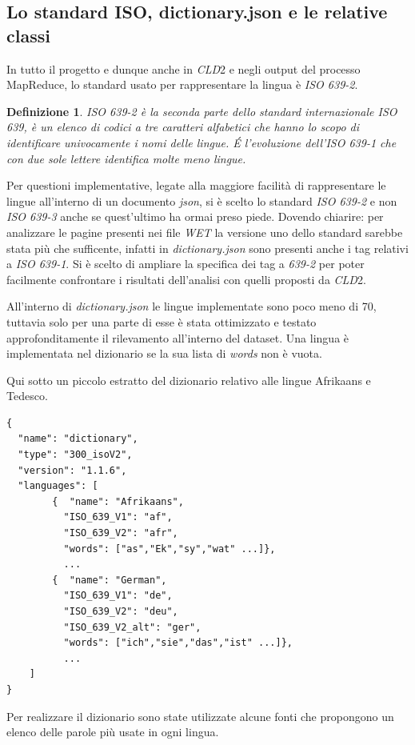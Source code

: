 \documentclass{article}
\newcommand{\MR}{MapReduce}
\newcommand{\cld}{\textit{CLD}2}
\newcommand{\WET}{\textit{WET}}
\newcommand{\isoOne}{\textit{ISO 639-1}}
\newcommand{\isoTwo}{\textit{ISO 639-2}}
\newcommand{\isoThree}{\textit{ISO 639-3}}
\newcommand{\filename}[1]{\textit{#1}}
\newtheorem*{definition}{Definizione}
\begin{document}
\subsection{Lo standard ISO, dictionary.json e le relative classi}
In tutto il progetto e dunque anche in \cld{} e negli output del processo \MR{}, lo standard usato per rappresentare la lingua è \isoTwo{}.

\begin{definition}
ISO 639-2 è la seconda parte dello standard internazionale ISO 639, è un elenco di codici a tre caratteri alfabetici che hanno lo scopo di identificare univocamente i nomi delle lingue. \'E l'evoluzione dell'ISO 639-1 che con due sole lettere identifica molte meno lingue. 
\end{definition}

Per questioni implementative, legate alla maggiore facilità di rappresentare le lingue all'interno di un documento \textit{json}, si è scelto lo standard \isoTwo{} e non \isoThree{} anche se quest'ultimo ha ormai preso piede. Dovendo chiarire: per analizzare le pagine presenti nei file \WET{} la versione uno dello standard sarebbe stata più che sufficente, infatti in \filename{dictionary.json} sono presenti anche i tag relativi a \isoOne. Si è scelto di ampliare la specifica dei tag a \textit{639-2} per poter facilmente confrontare i risultati dell'analisi con quelli proposti da \cld{}.

All'interno di \filename{dictionary.json} le lingue implementate sono poco meno di 70, tuttavia solo per una parte di esse è stata ottimizzato e testato approfonditamente il rilevamento all'interno del dataset. Una lingua è implementata nel dizionario se la sua lista di \textit{words} non è vuota.

Qui sotto un piccolo estratto del dizionario relativo alle lingue Afrikaans e Tedesco.
\begin{verbatim}
{
  "name": "dictionary",
  "type": "300_isoV2",
  "version": "1.1.6",
  "languages": [
        {  "name": "Afrikaans",
          "ISO_639_V1": "af",
          "ISO_639_V2": "afr",
          "words": ["as","Ek","sy","wat" ...]}, 
          ...
        {  "name": "German",
          "ISO_639_V1": "de",
          "ISO_639_V2": "deu",
          "ISO_639_V2_alt": "ger",
          "words": ["ich","sie","das","ist" ...]}, 
          ...
    ]
}
\end{verbatim}

Per realizzare il dizionario sono state utilizzate alcune fonti che propongono un elenco delle parole più usate in ogni lingua.\cite{1000words}\cite{101languages}
\end{document}
